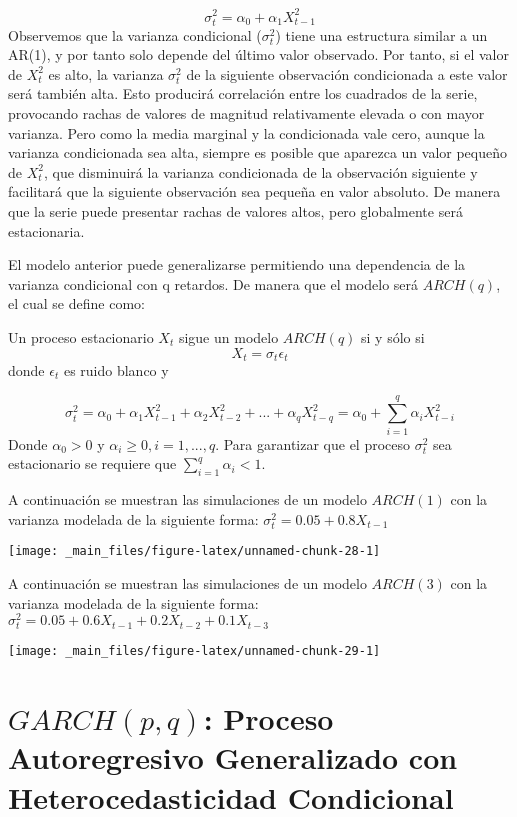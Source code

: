 \documentclass[
  a4paper,
  oneside,
  openany]{book}
\begin{document}
\[
\sigma^2_{t} = \alpha_0+\alpha_1 X^2_{t-1}
\]
Observemos que la varianza condicional (\(\sigma^2_t\)) tiene una estructura similar a un AR(1), y por tanto solo depende del último valor observado. Por tanto, si el valor de \(X^2_t\) es alto, la varianza \(\sigma^2_t\) de la siguiente observación condicionada a este valor será también alta. Esto producirá correlación entre los cuadrados de la serie, provocando rachas de valores de magnitud
relativamente elevada o con mayor varianza. Pero como la media marginal y la condicionada vale cero, aunque la varianza condicionada sea alta, siempre es posible que aparezca un valor pequeño de \(X^2_t\), que disminuirá la varianza condicionada de la
observación siguiente y facilitará que la siguiente observación sea pequeña en valor absoluto. De manera que la serie puede presentar rachas de valores altos, pero globalmente será estacionaria.

El modelo anterior puede generalizarse permitiendo una dependencia de la varianza condicional con q retardos. De manera que el modelo será \(ARCH(q)\), el cual se define como:

Un proceso estacionario \(X_t\) sigue un modelo \(ARCH(q)\) si y sólo si
\[
X_t=\sigma_t\epsilon_t
\]
donde \(\epsilon_t\) es ruido blanco y

\[
\sigma^2_{t} = \alpha_0+\alpha_1 X^2_{t-1}+\alpha_2 X^2_{t-2}+...+\alpha_q X^2_{t-q}= \alpha_0+\sum_{i=1}^q \alpha_i X^2_{t-i}
\]
Donde \(\alpha_0>0\) y \(\alpha_i\ge0, i=1,...,q\). Para garantizar que el proceso \(\sigma^2_t\) sea estacionario se requiere que \(\sum_{i=1}^q\alpha_i<1\).

A continuación se muestran las simulaciones de un modelo \(ARCH(1)\) con la varianza modelada de la siguiente forma: \(\sigma^2_{t}=0.05+ 0.8X_{t-1}\)

\begin{center}\texttt{[image: \_main\_files/figure-latex/unnamed-chunk-28-1]} \end{center}

A continuación se muestran las simulaciones de un modelo \(ARCH(3)\) con la varianza modelada de la siguiente forma: \(\sigma^2_{t}=0.05+ 0.6X_{t-1}+0.2X_{t-2}+0.1X_{t-3}\)

\begin{center}\texttt{[image: \_main\_files/figure-latex/unnamed-chunk-29-1]} \end{center}

\hypertarget{garchpq-proceso-autoregresivo-generalizado-con-heterocedasticidad-condicional}{%
\chapter{\texorpdfstring{\(GARCH(p,q)\): Proceso Autoregresivo Generalizado con Heterocedasticidad Condicional}{GARCH(p,q): Proceso Autoregresivo Generalizado con Heterocedasticidad Condicional}}\label{garchpq-proceso-autoregresivo-generalizado-con-heterocedasticidad-condicional}}
\end{document}

